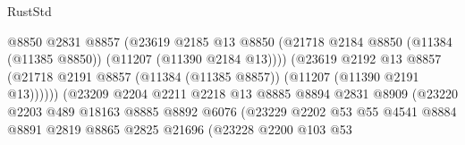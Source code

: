 \begin{lexlean}{RustStd}
\begin{coremodule}
                                          @8850
                                          @2831
                                          @8857
                                          (@23619
                                            @2185
                                            @13
                                            @8850
                                            (@21718
                                              @2184
                                              @8850
                                              (@11384 (@11385 @8850))
                                              (@11207 (@11390 @2184 @13))))
                                          (@23619
                                            @2192
                                            @13
                                            @8857
                                            (@21718
                                              @2191
                                              @8857
                                              (@11384 (@11385 @8857))
                                              (@11207 (@11390 @2191 @13))))))
                                      (@23209
                                        @2204
                                        @2211
                                        @2218
                                        @13
                                        @8885
                                        @8894
                                        @2831
                                        @8909
                                        (@23220
                                          @2203
                                          @489
                                          @18163
                                          @8885
                                          @8892
                                          @6076
                                          (@23229
                                            @2202
                                            @53
                                            @55
                                            @4541
                                            @8884
                                            @8891
                                            @2819
                                            @8865
                                            @2825
                                            @21696
                                            (@23228
                                              @2200
                                              @103
                                              @53

\end{coremodule}
\end{lexlean}
